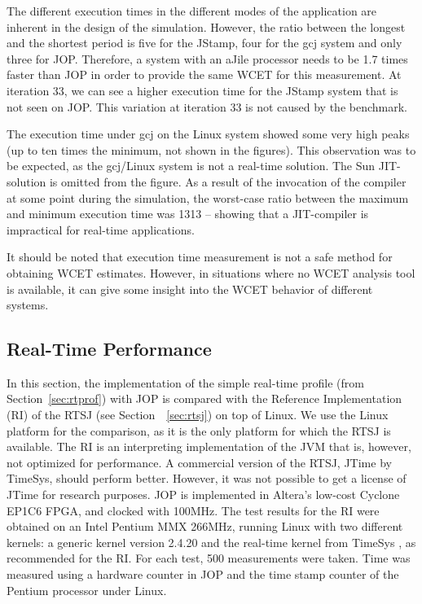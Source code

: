 The different execution times in the different modes of the
application are inherent in the design of the simulation. However,
the ratio between the longest and the shortest period is five for
the JStamp, four for the gcj system and only three for JOP.
Therefore, a system with an aJile processor needs to be 1.7 times
faster than JOP in order to provide the same WCET for this
measurement. At iteration 33, we can see a higher execution time for
the JStamp system that is not seen on JOP. This variation at
iteration 33 is not caused by the benchmark.

The execution time under gcj on the Linux system showed some very
high peaks (up to ten times the minimum, not shown in the figures).
This observation was to be expected, as the gcj/Linux system is not
a real-time solution. The Sun JIT-solution is omitted from the
figure. As a result of the invocation of the compiler at some point
during the simulation, the worst-case ratio between the maximum and
minimum execution time was 1313 -- showing that a JIT-compiler is
impractical for real-time applications.

It should be noted that execution time measurement is not a safe
method for obtaining WCET estimates. However, in situations where no
WCET analysis tool is available, it can give some insight into the
WCET behavior of different systems.


\subsection{Real-Time Performance}
\label{subsec:rt:perf}

In this section, the implementation of the simple real-time profile
(from Section~\ref{sec:rtprof}) with JOP is compared with the
Reference Implementation (RI) of the RTSJ (see
Section~~\ref{sec:rtsj}) on top of Linux. We use the Linux platform
for the comparison, as it is the only platform for which the RTSJ is
available. The RI is an interpreting implementation of the JVM that
is, however, not optimized for performance. A commercial version of
the RTSJ, JTime by TimeSys, should perform better. However, it was
not possible to get a license of JTime for research purposes. JOP is
implemented in Altera's low-cost Cyclone EP1C6 FPGA, and clocked
with 100MHz. The test results for the RI were obtained on an Intel
Pentium MMX 266MHz, running Linux with two different kernels: a
generic kernel version 2.4.20 and the real-time kernel from TimeSys
\cite{TimeSysLinux}, as recommended for the RI. For each test, 500
measurements were taken. Time was measured using a hardware counter
in JOP and the time stamp counter of the Pentium processor under
Linux.

